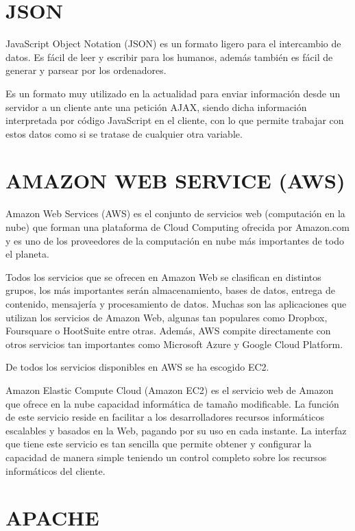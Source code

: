 \section{JSON} 
\label{sec:json}


JavaScript Object Notation (JSON) es un formato ligero para el intercambio de datos. Es fácil de leer y escribir para los humanos, además también es fácil de generar y parsear por los ordenadores.


Es un formato muy utilizado en la actualidad para enviar información desde un servidor a un cliente ante una petición AJAX, siendo dicha información interpretada por código JavaScript en el cliente, con lo que permite trabajar con estos datos como si se tratase de cualquier otra variable.



\section{AMAZON WEB SERVICE (AWS)} 
\label{sec:aws}

Amazon Web Services (AWS) es el conjunto de servicios web (computación en la nube) que forman una plataforma de Cloud Computing ofrecida por Amazon.com y es uno de los proveedores de la computación en nube más importantes de todo el planeta.


Todos los servicios que se ofrecen en Amazon Web se clasifican en distintos grupos, los más importantes serán almacenamiento, bases de datos, entrega de contenido, mensajería y procesamiento de datos. Muchas son las aplicaciones que utilizan los servicios de Amazon Web, algunas tan populares como Dropbox, Foursquare o HootSuite entre otras. Además, AWS compite directamente con otros servicios tan importantes como Microsoft Azure y Google Cloud Platform.


De todos los servicios disponibles en AWS se ha escogido EC2.


Amazon Elastic Compute Cloud (Amazon EC2) es el servicio web de Amazon que ofrece en la nube capacidad informática de tamaño modificable. La función de este servicio reside en facilitar a los desarrolladores recursos informáticos escalables y basados en la Web, pagando por su uso en cada instante. La interfaz que tiene este servicio es tan sencilla que permite obtener y configurar la capacidad de manera simple teniendo un control completo sobre los recursos informáticos del cliente.



\section{APACHE} 
\label{sec:apache}

